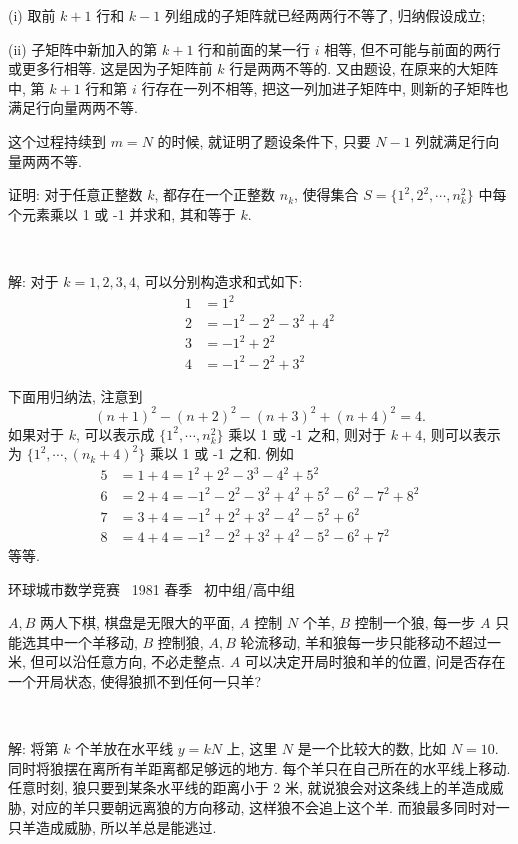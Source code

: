 (i) 取前 $ k + 1 $ 行和 $ k - 1 $ 列组成的子矩阵就已经两两行不等了, 归纳假设成立;

(ii) 子矩阵中新加入的第 $ k+1 $ 行和前面的某一行 $ i $ 相等, 但不可能与前面的两行或更多行相等. 这是因为子矩阵前 $ k $ 行是两两不等的. 又由题设, 在原来的大矩阵中, 第 $ k + 1 $ 行和第 $ i $ 行存在一列不相等, 把这一列加进子矩阵中, 则新的子矩阵也满足行向量两两不等.

这个过程持续到 $ m = N $ 的时候, 就证明了题设条件下, 只要 $ N - 1 $ 列就满足行向量两两不等.

\newpage
证明: 对于任意正整数 $k$, 都存在一个正整数 $n_k$, 使得集合 $S = \{1^2,2^2,\cdots,n_k^2\}$ 中每个元素乘以 1 或 -1 并求和, 其和等于 $k$.

~

解: 对于 $k=1,2,3,4$, 可以分别构造求和式如下:
\begin{align*}
1 &= 1^2 \\
2 &= -1^2 - 2^2 - 3^2 + 4^2\\
3 &= -1^2 + 2^2\\
4 &= -1^2 - 2^2 + 3^2
\end{align*}

下面用归纳法, 注意到
\[(n+1)^2 - (n+2)^2 - (n+3)^2 + (n+4)^2 = 4 .\]
如果对于 $k$, 可以表示成 $\{1^2,\cdots,n_k^2\}$ 乘以 1 或 -1 之和, 则对于 $k+4$, 则可以表示为 $\{1^2,\cdots,(n_k+4)^2\}$ 乘以 1 或 -1 之和. 例如 
\begin{align*}
5 &= 1 + 4 = 1^2 + 2^2 - 3^3 - 4^2 + 5^2 \\ 
6 &= 2 + 4 = -1^2 - 2^2 - 3^2 + 4^2 + 5^2 - 6^2 - 7^2 + 8^2\\
7 &= 3 + 4 = -1^2 + 2^2 + 3^2 - 4^2 - 5^2 + 6^2\\
8 &= 4 + 4 = -1^2 - 2^2 + 3^2 + 4^2 - 5^2 - 6^2 + 7^2
\end{align*}
等等.

\newpage

\noindent 环球城市数学竞赛~ 1981 春季~ 初中组/高中组

$ A, B $ 两人下棋, 棋盘是无限大的平面, $ A $ 控制 $ N $ 个羊, $ B $ 控制一个狼, 每一步 $ A $ 只能选其中一个羊移动, $B$ 控制狼, $A,B$ 轮流移动, 羊和狼每一步只能移动不超过一米, 但可以沿任意方向, 不必走整点. $ A $ 可以决定开局时狼和羊的位置, 问是否存在一个开局状态, 使得狼抓不到任何一只羊?

~

解: 将第 $ k $ 个羊放在水平线 $ y = kN $ 上, 这里 $ N $ 是一个比较大的数, 比如 $ N = 10 $. 同时将狼摆在离所有羊距离都足够远的地方. 每个羊只在自己所在的水平线上移动. 任意时刻, 狼只要到某条水平线的距离小于 2 米, 就说狼会对这条线上的羊造成威胁, 对应的羊只要朝远离狼的方向移动, 这样狼不会追上这个羊. 而狼最多同时对一只羊造成威胁, 所以羊总是能逃过.

